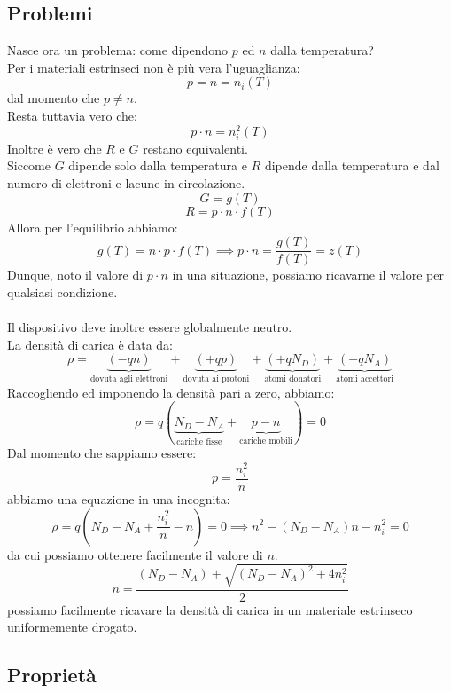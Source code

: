 \documentclass{article}
\numberwithin{equation}{subsection}
\begin{document}
	\subsection{Problemi}
	Nasce ora un problema: come dipendono $p$ ed $n$ dalla temperatura? \\
	Per i materiali estrinseci non è più vera l’uguaglianza:
	$$p = n = n_i(T)$$
	dal momento che $p \neq n$.\\
	Resta tuttavia vero che:
	$$p \cdot n = n_i^2(T)$$
	Inoltre è vero che $R$ e $G$ restano equivalenti. \\
	Siccome $G$ dipende solo dalla temperatura e $R$ dipende dalla temperatura e dal numero di elettroni e lacune in circolazione.
	$$G = g(T)$$
	$$R = p \cdot n \cdot f(T)$$
	Allora per l’equilibrio abbiamo:
	$$g(T) = n \cdot p \cdot f(T) \implies p \cdot n = \frac{g(T)}{f(T)} = z(T)$$
	Dunque, noto il valore di $p \cdot n$ in una situazione, possiamo ricavarne il valore per qualsiasi condizione.\\\\
	Il dispositivo deve inoltre essere globalmente neutro. \\
	La densità di carica è data da:
	$$\rho = \underbrace{(-qn)}_{\text{dovuta agli elettroni}} + \underbrace{(+qp)}_{\text{dovuta ai protoni}} + \underbrace{(+qN_D)}_{\text{atomi donatori}} + \underbrace{(-qN_A)}_{\text{atomi accettori}}$$
	Raccogliendo ed imponendo la densità pari a zero, abbiamo:
	$$\rho = q \left( \underbrace{N_D - N_A}_{\text{cariche fisse}} + \underbrace{p - n}_{\text{cariche mobili}} \right) = 0$$
	Dal momento che sappiamo essere:
	$$p = \frac{n_i^2}{n}$$
	abbiamo una equazione in una incognita:
	$$\rho = q\left(N_D - N_A + \frac{n_i^2}{n} - n\right) = 0 \implies n^2 - (N_D - N_A)n - n_i^2 = 0$$
	da cui possiamo ottenere facilmente il valore di $n$.
	$$n = \frac{(N_D - N_A) + \sqrt{(N_D - N_A)^2 + 4n_i^2}}{2}$$
	possiamo facilmente ricavare la densità di carica in un materiale estrinseco uniformemente drogato.
	\subsection{Proprietà}
\end{document}
